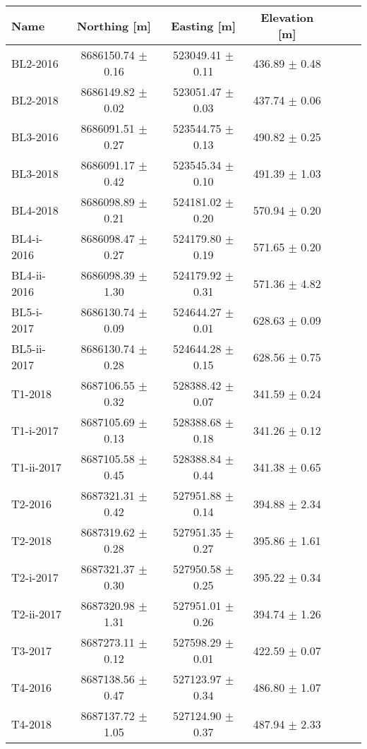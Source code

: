 \begin{tabular}{lcccccc}
\toprule
        Name &           Northing [m] &           Easting [m] &      Elevation [m] \\
\midrule
    BL2-2016 &  8686150.74 $\pm$ 0.16 &  523049.41 $\pm$ 0.11 &  436.89 $\pm$ 0.48 \\
    BL2-2018 &  8686149.82 $\pm$ 0.02 &  523051.47 $\pm$ 0.03 &  437.74 $\pm$ 0.06 \\
    BL3-2016 &  8686091.51 $\pm$ 0.27 &  523544.75 $\pm$ 0.13 &  490.82 $\pm$ 0.25 \\
    BL3-2018 &  8686091.17 $\pm$ 0.42 &  523545.34 $\pm$ 0.10 &  491.39 $\pm$ 1.03 \\
    BL4-2018 &  8686098.89 $\pm$ 0.21 &  524181.02 $\pm$ 0.20 &  570.94 $\pm$ 0.20 \\
  BL4-i-2016 &  8686098.47 $\pm$ 0.27 &  524179.80 $\pm$ 0.19 &  571.65 $\pm$ 0.20 \\
 BL4-ii-2016 &  8686098.39 $\pm$ 1.30 &  524179.92 $\pm$ 0.31 &  571.36 $\pm$ 4.82 \\
  BL5-i-2017 &  8686130.74 $\pm$ 0.09 &  524644.27 $\pm$ 0.01 &  628.63 $\pm$ 0.09 \\
 BL5-ii-2017 &  8686130.74 $\pm$ 0.28 &  524644.28 $\pm$ 0.15 &  628.56 $\pm$ 0.75 \\
     T1-2018 &  8687106.55 $\pm$ 0.32 &  528388.42 $\pm$ 0.07 &  341.59 $\pm$ 0.24 \\
   T1-i-2017 &  8687105.69 $\pm$ 0.13 &  528388.68 $\pm$ 0.18 &  341.26 $\pm$ 0.12 \\
  T1-ii-2017 &  8687105.58 $\pm$ 0.45 &  528388.84 $\pm$ 0.44 &  341.38 $\pm$ 0.65 \\
     T2-2016 &  8687321.31 $\pm$ 0.42 &  527951.88 $\pm$ 0.14 &  394.88 $\pm$ 2.34 \\
     T2-2018 &  8687319.62 $\pm$ 0.28 &  527951.35 $\pm$ 0.27 &  395.86 $\pm$ 1.61 \\
   T2-i-2017 &  8687321.37 $\pm$ 0.30 &  527950.58 $\pm$ 0.25 &  395.22 $\pm$ 0.34 \\
  T2-ii-2017 &  8687320.98 $\pm$ 1.31 &  527951.01 $\pm$ 0.26 &  394.74 $\pm$ 1.26 \\
     T3-2017 &  8687273.11 $\pm$ 0.12 &  527598.29 $\pm$ 0.01 &  422.59 $\pm$ 0.07 \\
     T4-2016 &  8687138.56 $\pm$ 0.47 &  527123.97 $\pm$ 0.34 &  486.80 $\pm$ 1.07 \\
     T4-2018 &  8687137.72 $\pm$ 1.05 &  527124.90 $\pm$ 0.37 &  487.94 $\pm$ 2.33 \\

\end{tabular}
